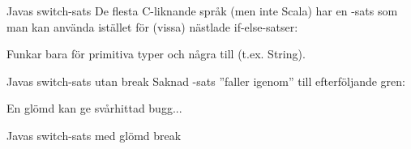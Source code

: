 \begin{Slide}{Javas switch-sats}\SlideFontSmall
De flesta C-liknande språk (men inte Scala) har en -sats som man kan använda istället för (vissa) nästlade if-else-satser:

\vspace{-0.5em}Funkar bara för primitiva typer och några till (t.ex. String).
\end{Slide}




\begin{Slide}{Javas switch-sats utan break}\SlideFontSmall
Saknad -sats ''faller igenom'' till efterföljande gren:

En glömd  kan ge svårhittad bugg...
\end{Slide}

\begin{Slide}{Javas switch-sats med glömd break}\SlideFontSmall

\vspace{-0.5em}

\vspace{-0.7em}\pause
{}

\end{Slide}


